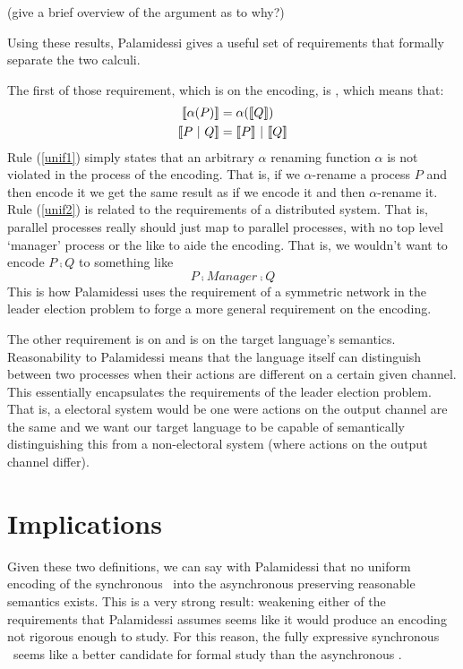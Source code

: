 (give a brief overview of the argument as to why?)

Using these results, Palamidessi gives a useful set of requirements that formally separate the two calculi.

The first of those requirement, which is on the encoding, is , which means that:
\begin{align}
	\llbracket{\alpha(P)}\rrbracket &= \alpha(\llbracket{Q}\rrbracket)\label{unif1}\\
	\llbracket{P \ensuremath{\ |\ } Q}\rrbracket &= \llbracket{P}\rrbracket \ |\  \llbracket{Q}\rrbracket\label{unif2}
\end{align}
Rule (\ref{unif1}) simply states that an arbitrary $\alpha$ renaming function $\alpha$  is not violated in the process of the encoding.  That is, if we $\alpha$-rename a process $P$ and then encode it we get the same result as if we encode it and then $\alpha$-rename it.
Rule (\ref{unif2}) is related to the requirements of a distributed system.  
That is, parallel processes really should just map to parallel processes, with no top level `manager' process or the like to aide the encoding.  That is, we wouldn't want to encode $P \comp Q$ to something like 
\[
	P \comp Manager \comp Q
\]
This is how Palamidessi uses the requirement of a symmetric network in the leader election problem to forge a more general requirement on the encoding.

The other requirement is on  and is on the target language's semantics.  
Reasonability to Palamidessi means that the language itself can distinguish between two processes when their actions are different on a certain given channel.  
This essentially encapsulates the requirements of the leader election problem.  
That is, a electoral system would be one were actions on the output channel are the same and we want our target language to be capable of semantically distinguishing this from a non-electoral system (where actions on the output channel differ).

\section{Implications}
Given these two definitions, we can say with Palamidessi that no uniform encoding of the synchronous \picalc\ into the asynchronous \picalc preserving reasonable semantics exists.  This is a very strong result:  weakening either of the requirements that Palamidessi assumes seems like it would produce an encoding not rigorous enough to study.  For this reason, the fully expressive synchronous \picalc\ seems like a better candidate for formal study than the asynchronous \picalc.

